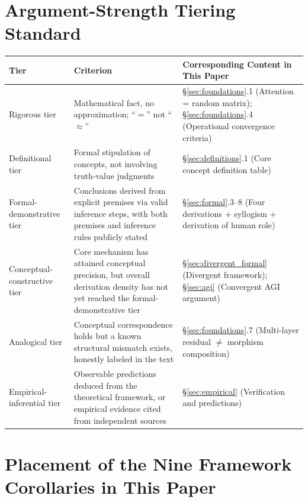 \documentclass[11pt,a4paper]{article}
\theoremstyle{definition}
\begin{document}
\section{Argument-Strength Tiering Standard}

\begin{table}[H]
\centering
\begin{tabular}{@{}p{2cm}p{5.5cm}p{5cm}@{}}
\toprule
\textbf{Tier} & \textbf{Criterion} & \textbf{Corresponding Content in This Paper} \\
\midrule
Rigorous tier & Mathematical fact, no approximation; ``$=$'' not ``$\approx$'' & \S\ref{sec:foundations}.1 (Attention = random matrix); \S\ref{sec:foundations}.4 (Operational convergence criteria) \\
Definitional tier & Formal stipulation of concepts, not involving truth-value judgments & \S\ref{sec:definitions}.1 (Core concept definition table) \\
Formal-demonstrative tier & Conclusions derived from explicit premises via valid inference steps, with both premises and inference rules publicly stated & \S\ref{sec:formal}.3--8 (Four derivations + syllogism + derivation of human role) \\
Conceptual-constructive tier & Core mechanism has attained conceptual precision, but overall derivation density has not yet reached the formal-demonstrative tier & \S\ref{sec:divergent_formal} (Divergent framework); \S\ref{sec:agi} (Convergent AGI argument) \\
Analogical tier & Conceptual correspondence holds but a known structural mismatch exists, honestly labeled in the text & \S\ref{sec:foundations}.7 (Multi-layer residual $\neq$ morphism composition) \\
Empirical-inferential tier & Observable predictions deduced from the theoretical framework, or empirical evidence cited from independent sources & \S\ref{sec:empirical} (Verification and predictions) \\
\bottomrule
\end{tabular}
\end{table}

\section{Placement of the Nine Framework Corollaries in This Paper}
\end{document}

